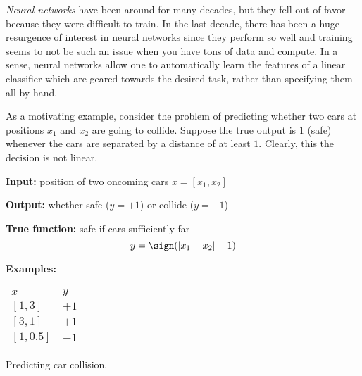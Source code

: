 \textit{Neural networks} have been around for many decades,
but they fell out of favor because they were difficult to train.
In the last decade, there has been a huge resurgence of interest in neural networks
since they perform so well and training seems to not be such an issue when you have tons of data and compute.
% 
In a sense, neural networks allow one to automatically learn the features of a linear classifier which are geared towards the desired task,
rather than specifying them all by hand.


\begin{example}
  As a motivating example, consider the problem of predicting whether two cars at positions $x_1$ and $x_2$ are going to collide.
  Suppose the true output is $1$ (safe) whenever the cars are separated by a distance of at least $1$.
  Clearly, this the decision is not linear.
  \br

  \noindent\textbf{Input:} position of two oncoming cars $x = [x_1, x_2]$
	
  \noindent\textbf{Output:} whether safe ($y = +1$) or collide ($y = -1$)

  \noindent\textbf{True function:} safe if cars sufficiently far
  \[y = \sign(|x_1 - x_2| - 1)\]

  \noindent\textbf{Examples:}
  \begin{tabular}{ll}
    $x$        & $y$\\
    $[1, 3]$   & $+1$\\
    $[3, 1]$   & $+1$\\
    $[1, 0.5]$ & $-1$
  \end{tabular}


  \caption{
	Predicting car collision.
  }
\end{example}




